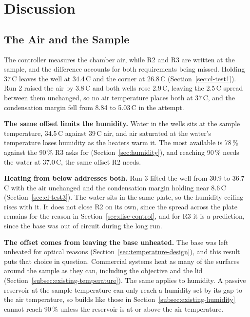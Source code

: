\chapter{Discussion}
\label{ch:discussion}

\section{The Air and the Sample}
\label{sec:disc-sample}

The controller measures the chamber air, while R2 and R3 are written at the sample, and the difference accounts for both requirements being missed. Holding 37\,\textdegree{}C leaves the well at 34.4\,\textdegree{}C and the corner at 26.8\,\textdegree{}C (Section~\ref{sec:cl-test1}). Run 2 raised the air by 3.8\,\textdegree{}C and both wells rose 2.9\,\textdegree{}C, leaving the 2.5\,\textdegree{}C spread between them unchanged, so no air temperature places both at 37\,\textdegree{}C, and the condensation margin fell from 8.84 to 5.03\,\textdegree{}C in the attempt.

\textbf{The same offset limits the humidity.} Water in the wells sits at the sample temperature, 34.5\,\textdegree{}C against 39\,\textdegree{}C air, and air saturated at the water's temperature loses humidity as the heaters warm it. The most available is 78\,\% against the 90\,\% R3 asks for (Section~\ref{sec:humidity}), and reaching 90\,\% needs the water at 37.0\,\textdegree{}C, the same offset R2 needs.

\textbf{Heating from below addresses both.} Run 3 lifted the well from 30.9 to 36.7\,\textdegree{}C with the air unchanged and the condensation margin holding near 8.6\,\textdegree{}C (Section~\ref{sec:cl-test3}). The water sits in the same plate, so the humidity ceiling rises with it. It does not close R2 on its own, since the spread across the plate remains for the reason in Section~\ref{sec:disc-control}, and for R3 it is a prediction, since the base was out of circuit during the long run.

\textbf{The offset comes from leaving the base unheated.} The base was left unheated for optical reasons (Section~\ref{sec:temperature-design}), and this result puts that choice in question. Commercial systems heat as many of the surfaces around the sample as they can, including the objective and the lid (Section~\ref{subsec:existing-temperature}). The same applies to humidity. A passive reservoir at the sample temperature can only reach a humidity set by its gap to the air temperature, so builds like those in Section~\ref{subsec:existing-humidity} cannot reach 90\,\% unless the reservoir is at or above the air temperature.

